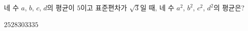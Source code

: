 네 수 $a$, $b$, $c$, $d$의 평균이 $5$이고 표준편차가 $\sqrt{3}$일 때, 네 수 $a^2$, $b^2$, $c^2$, $d^2$의 평균은?
\begin{choices32}{$25$}{$28$}{$30$}{$33$}{$35$}\end{choices32}
